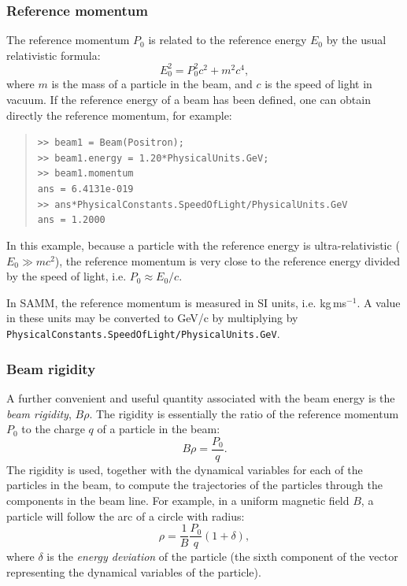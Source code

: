 \documentclass[11pt,twoside,a4paper]{article}
\begin{document}
\subsubsection{Reference momentum}
The reference momentum $P_0$ is related to the reference energy $E_0$ by the
usual relativistic formula:
\[
E_0^2 = P_0^2 c^2 + m^2c^4,
\]
where $m$ is the mass of a particle in the beam, and $c$ is the speed of light
in vacuum.  If the reference energy of a beam has been defined, one can
obtain directly the reference momentum, for example:
\begin{quote}
\texttt{>> beam1 = Beam(Positron); \\
>> beam1.energy = 1.20*PhysicalUnits.GeV; \\
>> beam1.momentum \\
ans = 6.4131e-019 \\
>> ans*PhysicalConstants.SpeedOfLight/PhysicalUnits.GeV \\
ans = 1.2000}
\end{quote}
In this example, because a particle with the reference energy is ultra-relativistic
($E_0 \gg mc^2$), the reference momentum is very close to the reference energy
divided by the speed of light, i.e. $P_0 \approx E_0/c$.

In SAMM, the reference momentum is measured in SI units, i.e. kg\,ms$^{-1}$.
A value in these units may be converted to GeV/c by multiplying by \\
\texttt{PhysicalConstants.SpeedOfLight/PhysicalUnits.GeV}.

\subsubsection{Beam rigidity}
A further convenient and useful quantity associated with the beam energy is
the \emph{beam rigidity}, $B\rho$.  The rigidity is
essentially the ratio of the reference momentum $P_0$ to the charge $q$ of a
particle in the beam:
\begin{equation}
B\rho = \frac{P_0}{q}.
\label{eq:rigidity}
\end{equation}
The rigidity is used, together with the dynamical variables for each of the particles
in the beam, to compute the trajectories of the particles through the components
in the beam line.  For example, in a uniform magnetic field $B$, a particle will
follow the arc of a circle with radius:
\[
\rho = \frac{1}{B} \frac{P_0}{q} (1 + \delta),
\]
where $\delta$ is the \emph{energy deviation} of the particle (the sixth component
of the vector representing the dynamical variables of the particle).
\end{document}
